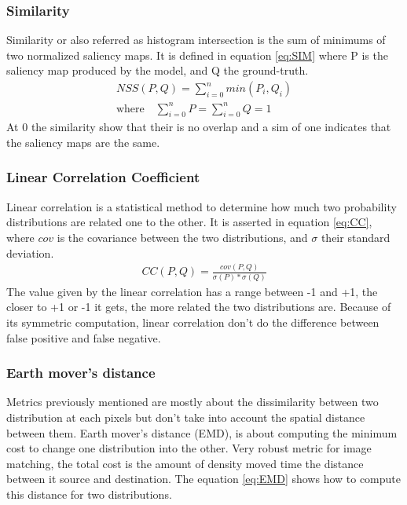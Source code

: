 \subsubsection{Similarity}
Similarity or also referred as histogram intersection is the sum of minimums of two normalized saliency maps. It is defined in equation \ref{eq:SIM} where P is the saliency map produced by the model, and Q the ground-truth.
\begin{equation}  
\begin{aligned}
    NSS(P,Q) = \sum\limits_{i=0}^n min(P_i, Q_i)\\
    \textrm{where} \quad \sum\limits_{i=0}^n P = \sum\limits_{i=0}^n Q = 1
\end{aligned}
\label{eq:SIM}
\end{equation}
At 0 the similarity show that their is no overlap and a sim of one indicates that the saliency maps are the same.

\subsubsection{Linear Correlation Coefficient}
Linear correlation is a statistical method to determine how much two probability distributions are related one to the other. It is asserted in equation \ref{eq:CC}, where $cov$ is the covariance between the two distributions, and $\sigma$ their standard deviation.
\begin{equation}  
\begin{aligned}
    CC(P,Q) = \frac{cov(P,Q)}{\sigma(P)*\sigma(Q)} 
\end{aligned}
\label{eq:CC}
\end{equation}
The value given by the linear correlation has a range between -1 and +1, the closer to +1 or -1 it gets, the more related the two distributions are. Because of its symmetric computation, linear correlation don't do the difference between false positive and false negative. 

\subsubsection{Earth mover's distance}
Metrics previously mentioned are mostly about the dissimilarity between two distribution at each pixels but don't take into account the spatial distance between them. Earth mover's distance (EMD), is about computing the minimum cost to change one distribution into the other. Very robust metric for image matching, the total cost is the amount of density moved time the distance between it source and destination. The equation \ref{eq:EMD} shows how to compute this distance for two distributions.

